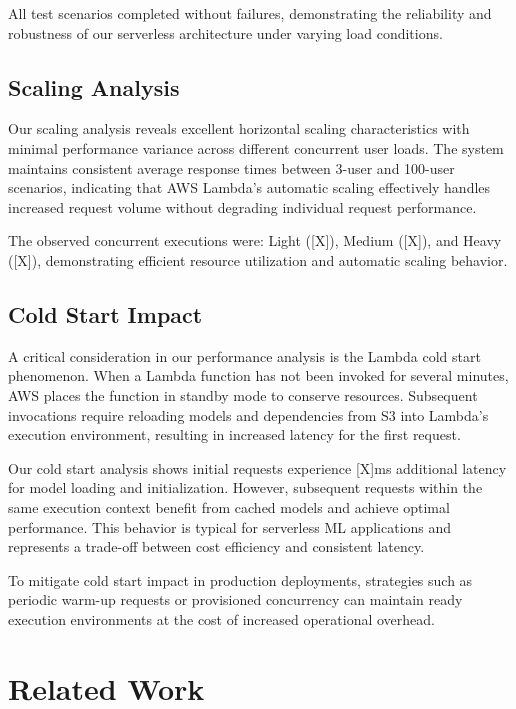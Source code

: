 \documentclass[conference]{IEEEtran}
\begin{document}
All test scenarios completed without failures, demonstrating the reliability and robustness of our serverless architecture under varying load conditions.

\subsection{Scaling Analysis}

Our scaling analysis reveals excellent horizontal scaling characteristics with minimal performance variance across different concurrent user loads. The system maintains consistent average response times between 3-user and 100-user scenarios, indicating that AWS Lambda's automatic scaling effectively handles increased request volume without degrading individual request performance.

The observed concurrent executions were: Light ([X]), Medium ([X]), and Heavy ([X]), demonstrating efficient resource utilization and automatic scaling behavior.

\subsection{Cold Start Impact}

A critical consideration in our performance analysis is the Lambda cold start phenomenon. When a Lambda function has not been invoked for several minutes, AWS places the function in standby mode to conserve resources. Subsequent invocations require reloading models and dependencies from S3 into Lambda's execution environment, resulting in increased latency for the first request.

Our cold start analysis shows initial requests experience [X]ms additional latency for model loading and initialization. However, subsequent requests within the same execution context benefit from cached models and achieve optimal performance. This behavior is typical for serverless ML applications and represents a trade-off between cost efficiency and consistent latency.

To mitigate cold start impact in production deployments, strategies such as periodic warm-up requests or provisioned concurrency can maintain ready execution environments at the cost of increased operational overhead.

\section{Related Work}
\end{document}
